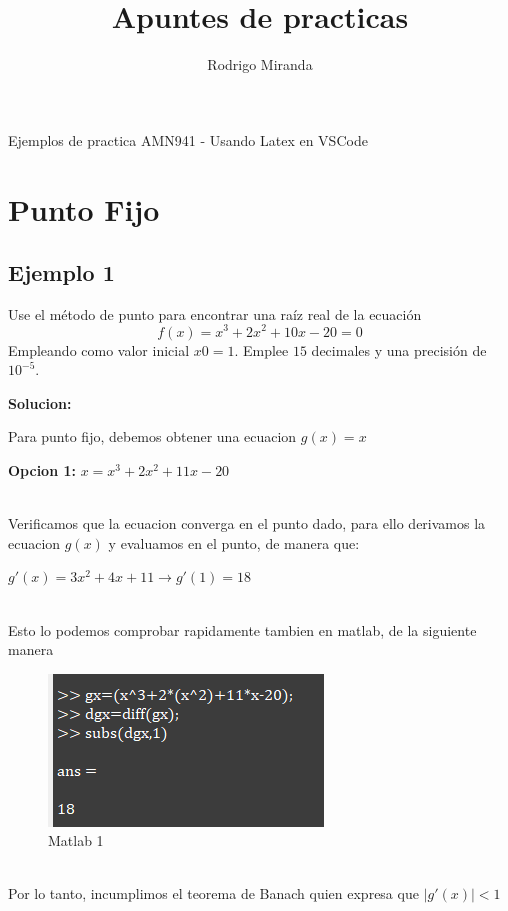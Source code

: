 \documentclass{article}
\title{Apuntes de practicas}
\author{Rodrigo Miranda}
\theoremstyle{mytheoremstyle}
\theoremstyle{mytheoremstyle}
\theoremstyle{myproblemstyle}
\begin{document}
    \maketitle
    Ejemplos de practica AMN941  - Usando Latex en VSCode
    \section*{Punto Fijo}
    \subsection*{Ejemplo 1}Use el método de punto para encontrar una raíz real de la ecuación
    \[
        f(x)= x^{3}+2x^{2}+10x-20 =0
        \]
    Empleando como valor inicial $x0=1$. Emplee $15$ decimales y una precisión de $10^{-5}$.


    \textbf{Solucion:} 

    \noindent Para punto fijo, debemos obtener una ecuacion $g(x)=x$ 


    \textbf{Opcion 1:} $x= x^{3}+2x^{2}+11x-20$
    
    \noindent \\ Verificamos que la ecuacion converga en el punto dado, para ello derivamos la ecuacion $g(x)$ y evaluamos en el punto, de manera que:

    $g'(x)=3x^{2}+4x+11 \longrightarrow g'(1)=18$

    \noindent \\ Esto lo podemos comprobar rapidamente tambien en matlab, de la siguiente manera
    \begin{figure}[ht]
        \includegraphics[scale=1]{img/ejemplo_clasePunto.png}
        \caption[Derivada y evaluacion g'(x)]{Matlab 1}
    \end{figure}
    \\Por lo tanto, incumplimos el teorema de Banach quien expresa que $|g'(x)|<1$ \pagebreak
    
\end{document}
